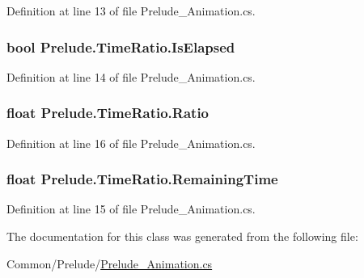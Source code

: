 Definition at line 13 of file Prelude\+\_\+\+Animation.\+cs.

\hypertarget{class_prelude_1_1_time_ratio_a567bf1260287d1d3fe84ec656a281fb5}{
\subsubsection[{Is\+Elapsed}]{\setlength{\rightskip}{0pt plus 5cm}bool Prelude.\+Time\+Ratio.\+Is\+Elapsed\hspace{0.3cm}{\ttfamily [get]}}}\label{class_prelude_1_1_time_ratio_a567bf1260287d1d3fe84ec656a281fb5}


Definition at line 14 of file Prelude\+\_\+\+Animation.\+cs.

\hypertarget{class_prelude_1_1_time_ratio_a883b17811a61925028b37abce3f2ab32}{
\subsubsection[{Ratio}]{\setlength{\rightskip}{0pt plus 5cm}float Prelude.\+Time\+Ratio.\+Ratio\hspace{0.3cm}{\ttfamily [get]}}}\label{class_prelude_1_1_time_ratio_a883b17811a61925028b37abce3f2ab32}


Definition at line 16 of file Prelude\+\_\+\+Animation.\+cs.

\hypertarget{class_prelude_1_1_time_ratio_a58e22f53e3d2902ec6d58a136aee876c}{
\subsubsection[{Remaining\+Time}]{\setlength{\rightskip}{0pt plus 5cm}float Prelude.\+Time\+Ratio.\+Remaining\+Time\hspace{0.3cm}{\ttfamily [get]}}}\label{class_prelude_1_1_time_ratio_a58e22f53e3d2902ec6d58a136aee876c}


Definition at line 15 of file Prelude\+\_\+\+Animation.\+cs.



The documentation for this class was generated from the following file\+:\begin{DoxyCompactItemize}
\item 
Common/\+Prelude/\hyperlink{_prelude___animation_8cs}{Prelude\+\_\+\+Animation.\+cs}\end{DoxyCompactItemize}

